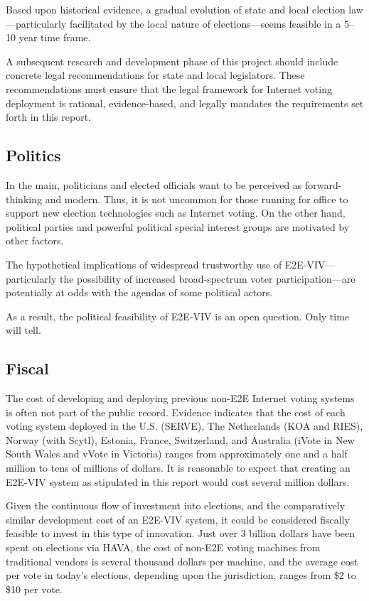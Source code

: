 Based upon historical evidence, a gradual evolution of state and local
election law---particularly facilitated by the local nature of
elections---seems feasible in a 5--10 year time frame.

A subsequent research and development phase of this project should
include concrete legal recommendations for state and local
legislators.  These recommendations must ensure that the legal
framework for Internet voting deployment is rational, evidence-based,
and legally mandates the requirements set forth in this report.

\subsection{Politics}

In the main, politicians and elected officials want to be perceived as
forward-thinking and modern.  Thus, it is not uncommon for those
running for office to support new election technologies such as
Internet voting.  On the other hand, political parties and powerful
political special interest groups are motivated by other factors.

The hypothetical implications of widespread trustworthy use of
E2E-VIV---particularly the possibility of increased broad-spectrum
voter participation---are potentially at odds with the agendas of some
political actors.

As a result, the political feasibility of E2E-VIV is an open question.
Only time will tell.

\subsection{Fiscal}
\label{sec:fiscal}

The cost of developing and deploying previous non-E2E Internet voting
systems is often not part of the public record.  Evidence indicates
that the cost of each voting system deployed in the U.S. (SERVE), The
Netherlands (KOA and RIES), Norway (with Scytl), Estonia, France,
Switzerland, and Australia (iVote in New South Wales and vVote in
Victoria) ranges from approximately one and a half million to tens of
millions of dollars. It is reasonable to expect that creating an
E2E-VIV system as stipulated in this report would cost several million
dollars.

Given the continuous flow of investment into elections, and the
comparatively similar development cost of an E2E-VIV system, it could
be considered fiscally feasible to invest in this type of
innovation. Just over 3 billion dollars have been spent on elections
via HAVA, the cost of non-E2E voting machines from traditional vendors
is several thousand dollars per machine, and the average cost per vote
in today's elections, depending upon the jurisdiction, ranges from \$2
to \$10 per vote.

